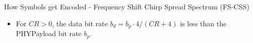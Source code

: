 \begin{frame}{How Symbols get Encoded - \alert{Frequency Shift} Chirp Spread Spectrum (FS-CSS)}
\begin{itemize}
    \begin{itemize}
      \item[$\Rightarrow$] For $CR > 0$, the \alert{data bit rate} $b_d  = b_p \cdot 4 / (CR + 4)$ is less than the \alert{PHYPayload bit rate $b_p$}.
    \end{itemize}
  \end{itemize}
\end{frame}
